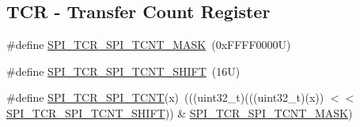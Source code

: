 \subsection*{T\+CR -\/ Transfer Count Register}
\begin{DoxyCompactItemize}
\item 
\#define \mbox{\hyperlink{group___s_p_i___register___masks_ga3b9bdb39b00af35d3f731123bc82d143}{S\+P\+I\+\_\+\+T\+C\+R\+\_\+\+S\+P\+I\+\_\+\+T\+C\+N\+T\+\_\+\+M\+A\+SK}}~(0x\+F\+F\+F\+F0000\+U)
\item 
\#define \mbox{\hyperlink{group___s_p_i___register___masks_ga4ac4f90bab2c1a761f439f50bcdca71f}{S\+P\+I\+\_\+\+T\+C\+R\+\_\+\+S\+P\+I\+\_\+\+T\+C\+N\+T\+\_\+\+S\+H\+I\+FT}}~(16\+U)
\item 
\#define \mbox{\hyperlink{group___s_p_i___register___masks_ga3e79144ff705279f17e657cd3d596afa}{S\+P\+I\+\_\+\+T\+C\+R\+\_\+\+S\+P\+I\+\_\+\+T\+C\+NT}}(x)~(((uint32\+\_\+t)(((uint32\+\_\+t)(x)) $<$$<$ \mbox{\hyperlink{group___s_p_i___register___masks_ga4ac4f90bab2c1a761f439f50bcdca71f}{S\+P\+I\+\_\+\+T\+C\+R\+\_\+\+S\+P\+I\+\_\+\+T\+C\+N\+T\+\_\+\+S\+H\+I\+FT}})) \& \mbox{\hyperlink{group___s_p_i___register___masks_ga3b9bdb39b00af35d3f731123bc82d143}{S\+P\+I\+\_\+\+T\+C\+R\+\_\+\+S\+P\+I\+\_\+\+T\+C\+N\+T\+\_\+\+M\+A\+SK}})
\end{DoxyCompactItemize}
